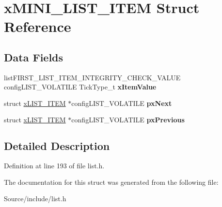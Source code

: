 \hypertarget{structx_m_i_n_i___l_i_s_t___i_t_e_m}{}\section{x\+M\+I\+N\+I\+\_\+\+L\+I\+S\+T\+\_\+\+I\+T\+E\+M Struct Reference}
\label{structx_m_i_n_i___l_i_s_t___i_t_e_m}
\subsection*{Data Fields}
\begin{DoxyCompactItemize}
\item 
\hypertarget{structx_m_i_n_i___l_i_s_t___i_t_e_m_aa6f3caf3e73107fb0da6fede4b06f104}{}list\+F\+I\+R\+S\+T\+\_\+\+L\+I\+S\+T\+\_\+\+I\+T\+E\+M\+\_\+\+I\+N\+T\+E\+G\+R\+I\+T\+Y\+\_\+\+C\+H\+E\+C\+K\+\_\+\+V\+A\+L\+U\+E config\+L\+I\+S\+T\+\_\+\+V\+O\+L\+A\+T\+I\+L\+E Tick\+Type\+\_\+t {\bfseries x\+Item\+Value}\label{structx_m_i_n_i___l_i_s_t___i_t_e_m_aa6f3caf3e73107fb0da6fede4b06f104}

\item 
\hypertarget{structx_m_i_n_i___l_i_s_t___i_t_e_m_a77927cd93dda0c59b3855aca58881ca1}{}struct \hyperlink{structx_l_i_s_t___i_t_e_m}{x\+L\+I\+S\+T\+\_\+\+I\+T\+E\+M} $\ast$config\+L\+I\+S\+T\+\_\+\+V\+O\+L\+A\+T\+I\+L\+E {\bfseries px\+Next}\label{structx_m_i_n_i___l_i_s_t___i_t_e_m_a77927cd93dda0c59b3855aca58881ca1}

\item 
\hypertarget{structx_m_i_n_i___l_i_s_t___i_t_e_m_a0294e93ecc18bcdb723038af1027505d}{}struct \hyperlink{structx_l_i_s_t___i_t_e_m}{x\+L\+I\+S\+T\+\_\+\+I\+T\+E\+M} $\ast$config\+L\+I\+S\+T\+\_\+\+V\+O\+L\+A\+T\+I\+L\+E {\bfseries px\+Previous}\label{structx_m_i_n_i___l_i_s_t___i_t_e_m_a0294e93ecc18bcdb723038af1027505d}

\end{DoxyCompactItemize}


\subsection{Detailed Description}


Definition at line 193 of file list.\+h.



The documentation for this struct was generated from the following file\+:\begin{DoxyCompactItemize}
\item 
Source/include/list.\+h\end{DoxyCompactItemize}
